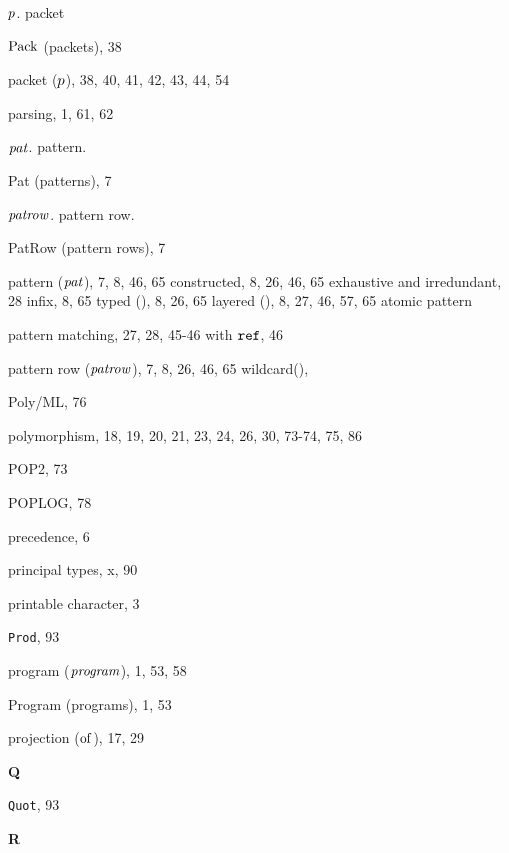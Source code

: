\begin{theindex}
\item $p$. \see packet 
\item ${\rm Pack}$ (packets), 38
\item packet ($p$), 38, 40, 41, 42, 43, 44, 54
\item parsing, 1, 61, 62
\item ${\it pat}$. \see pattern.
\item Pat (patterns), 7
\item ${\it patrow}$. \see pattern row.
\item PatRow (pattern rows), 7
\item pattern (${\it pat}$), 7, 8, 46, 65
\subitem constructed, 8, 26, 46, 65
\subitem exhaustive and irredundant, 28
\subitem infix, 8, 65
\subitem typed (\boxml{:}), 8, 26, 65
\subitem layered (), 8, 27, 46, 57, 65
\subitem \seealso atomic pattern
\item pattern matching, 27, 28, 45-46
\subitem with $\mbox{\tt ref}$, 46
\item pattern row (${\it patrow}$), 7, 8, 26, 46, 65
\subitem wildcard(), \dotdotdotrefs
\item Poly/ML, 76
\item polymorphism, 18, 19, 20, 21, 23, 24, 26, 30, 73-74, 75, 86 
\item POP2, 73
\item POPLOG, 78
\item precedence, 6
\item principal types, x, 90
\item printable character, 3
\item {\tt Prod}, 93
\item program (${\it program}$), 1, 53, 58
\item Program (programs), 1, 53
\item projection ($\mathbin{\rm of}$), 17, 29
\indexspace

\parbox{65mm}{\hfil{\large\bf Q}\hfil}

\indexspace

\item {\tt Quot}, 93
\indexspace

\parbox{65mm}{\hfil{\large\bf R}\hfil}

\indexspace


\end{theindex}
